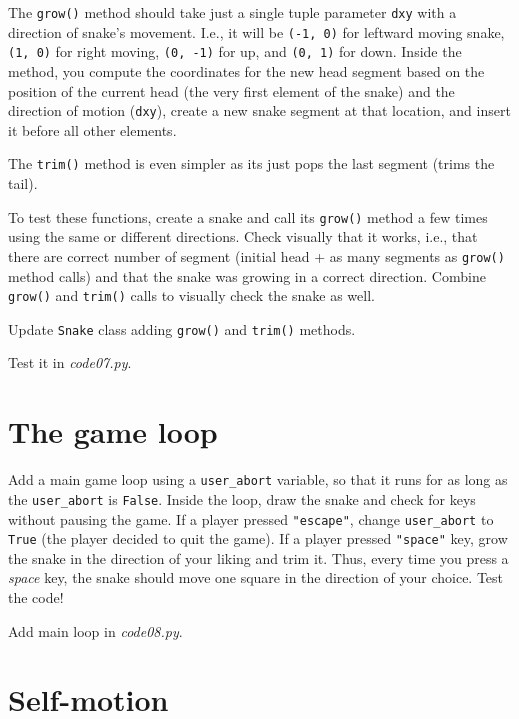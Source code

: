 \documentclass[
]{book}
\begin{document}
The \texttt{grow()} method should take just a single tuple parameter \texttt{dxy} with a direction of snake's movement. I.e., it will be \texttt{(-1,\ 0)} for leftward moving snake, \texttt{(1,\ 0)} for right moving, \texttt{(0,\ -1)} for up, and \texttt{(0,\ 1)} for down. Inside the method, you compute the coordinates for the new head segment based on the position of the current head (the very first element of the snake) and the direction of motion (\texttt{dxy}), create a new snake segment at that location, and insert it before all other elements.

The \texttt{trim()} method is even simpler as its just pops the last segment (trims the tail).

To test these functions, create a snake and call its \texttt{grow()} method a few times using the same or different directions. Check visually that it works, i.e., that there are correct number of segment (initial head + as many segments as \texttt{grow()} method calls) and that the snake was growing in a correct direction. Combine \texttt{grow()} and \texttt{trim()} calls to visually check the snake as well.

Update \texttt{Snake} class adding \texttt{grow()} and \texttt{trim()} methods.

Test it in \emph{code07.py}.

\hypertarget{the-game-loop}{%
\section{The game loop}\label{the-game-loop}}

Add a main game loop using a \texttt{user\_abort} variable, so that it runs for as long as the \texttt{user\_abort} is \texttt{False}. Inside the loop, draw the snake and check for keys without pausing the game. If a player pressed \texttt{"escape"}, change \texttt{user\_abort} to \texttt{True} (the player decided to quit the game). If a player pressed \texttt{"space"} key, grow the snake in the direction of your liking and trim it. Thus, every time you press a \emph{space} key, the snake should move one square in the direction of your choice. Test the code!

Add main loop in \emph{code08.py}.

\hypertarget{self-motion}{%
\section{Self-motion}\label{self-motion}}
\end{document}
